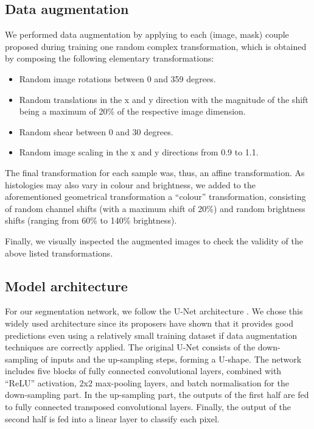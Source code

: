 \documentclass[conference]{IEEEtran}
\begin{document}
\subsection{Data augmentation}
We performed data augmentation by applying to each (image, mask) couple proposed during training one random complex transformation, which is obtained by composing the following elementary transformations:
\begin{itemize}
    \itemsep0em
    \item Random image rotations between 0 and 359 degrees.
    \item Random translations in the x and y direction with the magnitude of the shift being a maximum of 20\% of the respective image dimension.
    \item Random shear between 0 and 30 degrees.
    \item Random image scaling in the x and y directions from 0.9 to 1.1.
\end{itemize}
The final transformation for each sample was, thus, an affine transformation.
As histologies may also vary in colour and brightness, we added to the aforementioned geometrical transformation a “colour” transformation, consisting of random channel shifts (with a maximum shift of 20\%) and random brightness shifts (ranging from 60\% to 140\% brightness).

Finally, we visually inspected the augmented images to check the validity of the above listed transformations.

\subsection{Model architecture}
For our segmentation network, we follow the U-Net architecture \cite{unet}. We chose this widely used architecture since its proposers have shown that it provides good predictions even using a relatively small training dataset if data augmentation techniques are correctly applied. The original U-Net consists of the down-sampling of inputs and the up-sampling steps, forming a U-shape. The network includes five blocks of fully connected convolutional layers, combined with “ReLU” activation, 2x2 max-pooling layers, and batch normalisation for the down-sampling part. In the up-sampling part, the outputs of the first half are fed to fully connected transposed convolutional layers. Finally, the output of the second half is fed into a linear layer to classify each pixel.
 
\end{document}
